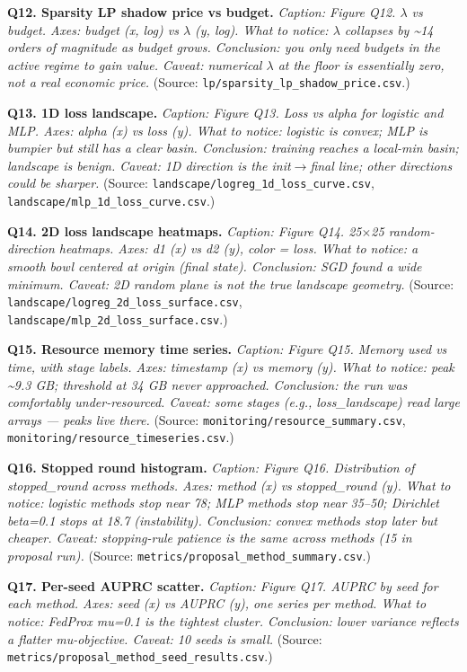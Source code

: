 \documentclass{article}
\begin{document}
\textbf{Q12. Sparsity LP shadow price vs budget.} \emph{Caption: Figure Q12. \ensuremath{\lambda} vs budget. Axes: budget (x, log) vs \ensuremath{\lambda} (y, log). What to notice: \ensuremath{\lambda} collapses by \textasciitilde{}14 orders of magnitude as budget grows. Conclusion: you only need budgets in the active regime to gain value. Caveat: numerical \ensuremath{\lambda} at the floor is essentially zero, not a real economic price.} (Source: \texttt{lp/sparsity\_lp\_shadow\_price.csv}.)


\textbf{Q13. 1D loss landscape.} \emph{Caption: Figure Q13. Loss vs alpha for logistic and MLP. Axes: alpha (x) vs loss (y). What to notice: logistic is convex; MLP is bumpier but still has a clear basin. Conclusion: training reaches a local-min basin; landscape is benign. Caveat: 1D direction is the init\ensuremath{\rightarrow}final line; other directions could be sharper.} (Source: \texttt{landscape/logreg\_1d\_loss\_curve.csv}, \texttt{landscape/mlp\_1d\_loss\_curve.csv}.)


\textbf{Q14. 2D loss landscape heatmaps.} \emph{Caption: Figure Q14. 25\ensuremath{\times}25 random-direction heatmaps. Axes: d1 (x) vs d2 (y), color = loss. What to notice: a smooth bowl centered at origin (final state). Conclusion: SGD found a wide minimum. Caveat: 2D random plane is not the true landscape geometry.} (Source: \texttt{landscape/logreg\_2d\_loss\_surface.csv}, \texttt{landscape/mlp\_2d\_loss\_surface.csv}.)


\textbf{Q15. Resource memory time series.} \emph{Caption: Figure Q15. Memory used vs time, with stage labels. Axes: timestamp (x) vs memory (y). What to notice: peak \textasciitilde{}9.3 GB; threshold at 34 GB never approached. Conclusion: the run was comfortably under-resourced. Caveat: some stages (e.g., loss\_landscape) read large arrays --- peaks live there.} (Source: \texttt{monitoring/resource\_summary.csv}, \texttt{monitoring/resource\_timeseries.csv}.)


\textbf{Q16. Stopped round histogram.} \emph{Caption: Figure Q16. Distribution of stopped\_round across methods. Axes: method (x) vs stopped\_round (y). What to notice: logistic methods stop near 78; MLP methods stop near 35--50; Dirichlet beta=0.1 stops at 18.7 (instability). Conclusion: convex methods stop later but cheaper. Caveat: stopping-rule patience is the same across methods (15 in proposal run).} (Source: \texttt{metrics/proposal\_method\_summary.csv}.)


\textbf{Q17. Per-seed AUPRC scatter.} \emph{Caption: Figure Q17. AUPRC by seed for each method. Axes: seed (x) vs AUPRC (y), one series per method. What to notice: FedProx mu=0.1 is the tightest cluster. Conclusion: lower variance reflects a flatter mu-objective. Caveat: 10 seeds is small.} (Source: \texttt{metrics/proposal\_method\_seed\_results.csv}.)
\end{document}
